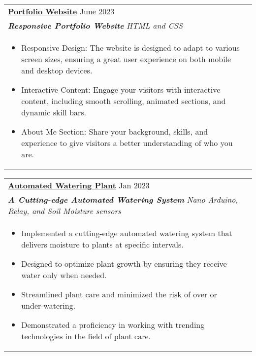 \documentclass[a4paper,8pt]{article}
\begin{document}
\begin{tabularx}{\linewidth}{ @{}l r@{} }
\color[HTML]{1C033C} \textbf{\uline{\href{https://adityaec2024.github.io/MyPortfolio/}{Portfolio Website}}} \hfill \color[HTML]{371e77} June 2023 \\[4pt]
\color[HTML]{371e77}\textbf{\textit{Responsive Portfolio Website}} \hfill \color[HTML]{4B28A4} \textit{  HTML and CSS} \\[5pt]
\begin{minipage}[t]{\linewidth}
    \begin{itemize}[nosep,after=\strut, leftmargin=2em, itemsep=2pt]
        \item Responsive Design: The website is designed to adapt to various screen sizes, ensuring a great user experience on both mobile and desktop devices.
        \item Interactive Content: Engage your visitors with interactive content, including smooth scrolling, animated sections, and dynamic skill bars.
        \item About Me Section: Share your background, skills, and experience to give visitors a better understanding of who you are.
    \end{itemize}
    \end{minipage}
\end{tabularx}

\begin{tabularx}{\linewidth}{ @{}l r@{} }
\color[HTML]{1C033C} \textbf{\uline{\href{https://github.com/adityaec2024/Automated-Watering-Plant}{Automated Watering Plant}}} \hfill \color[HTML]{371e77} Jan 2023 \\[4pt]
\color[HTML]{371e77}\textbf{\textit{ A Cutting-edge Automated Watering System}} \hfill \color[HTML]{4B28A4} \textit{ Nano Arduino, Relay, and Soil Moisture sensors} \\[5pt]
\begin{minipage}[t]{\linewidth}
    \begin{itemize}[nosep,after=\strut, leftmargin=2em, itemsep=2pt]
        \item Implemented a cutting-edge automated watering system that delivers moisture to plants at specific intervals.
        \item Designed to optimize plant growth by ensuring they receive water only when needed.
        \item Streamlined plant care and minimized the risk of over or under-watering.
        \item Demonstrated a proficiency in working with trending technologies in the field of plant care.
    \end{itemize}
    \end{minipage}
\end{tabularx}
\end{document}
